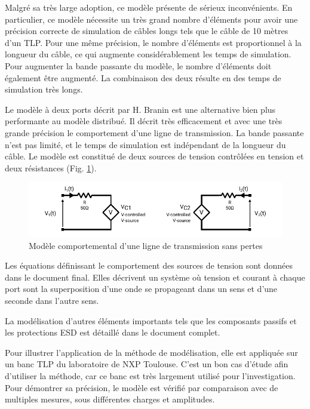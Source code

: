 Malgré sa très large adoption, ce modèle présente de sérieux inconvénients.
En particulier, ce modèle nécessite un très grand nombre d'éléments pour avoir une précision correcte de simulation de câbles longs tels que le câble de 10 mètres d'un TLP.
Pour une même précision, le nombre d'éléments est proportionnel à la longueur du câble, ce qui augmente considérablement les temps de simulation.
Pour augmenter la bande passante du modèle, le nombre d'éléments doit également être augmenté.
La combinaison des deux résulte en des temps de simulation très longs.

Le modèle à deux ports décrit par H. Branin \cite{branin-tl-ref} est une alternative bien plus performante au modèle distribué.
Il décrit très efficacement et avec une très grande précision le comportement d'une ligne de transmission.
La bande passante n'est pas limité, et le temps de simulation est indépendant de la longueur du câble.
Le modèle est constitué de deux sources de tension contrôlées en tension et deux résistances (Fig. \ref{fig:beh-line-model}).

\begin{figure}[!h]
  \centering
  \includegraphics[width=\textwidth]{src/1/figures/behavioral_line_model.pdf}
  \caption{Modèle comportemental d'une ligne de transmission sans pertes}
  \label{fig:beh-line-model}
\end{figure}

Les équations définissant le comportement des sources de tension sont données dans le document final.
Elles décrivent un système où tension et courant à chaque port sont la superposition d'une onde se propageant dans un sens et d'une seconde dans l'autre sens.

La modélisation d'autres éléments importants tels que les composants passifs et les protections ESD est détaillé dans le document complet.

Pour illustrer l'application de la méthode de modélisation, elle est appliquée sur un banc TLP du laboratoire de NXP Toulouse.
C'est un bon cas d'étude afin d'utiliser la méthode, car ce banc est très largement utilisé pour l'investigation.
Pour démontrer sa précision, le modèle est vérifié par comparaison avec de multiples mesures, sous différentes charges et amplitudes.

